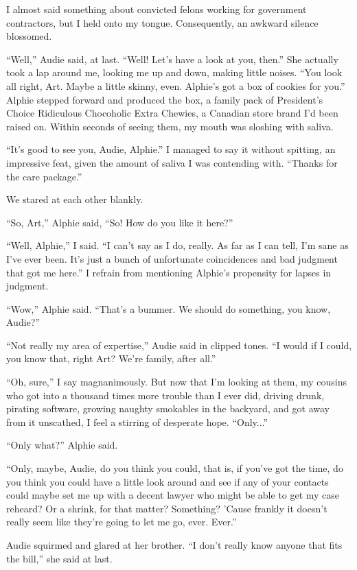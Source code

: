 I almost said something about convicted felons working for
government contractors, but I held onto my tongue. Consequently, an
awkward silence blossomed.

“Well,” Audie said, at last. “Well! Let’s have a look at you,
then.” She actually took a lap around me, looking me up and down,
making little noises. “You look all right, Art. Maybe a little
skinny, even. Alphie’s got a box of cookies for you.” Alphie
stepped forward and produced the box, a family pack of President’s
Choice Ridiculous Chocoholic Extra Chewies, a Canadian store brand
I’d been raised on. Within seconds of seeing them, my mouth was
sloshing with saliva.

“It’s good to see you, Audie, Alphie.” I managed to say it without
spitting, an impressive feat, given the amount of saliva I was
contending with. “Thanks for the care package.”

We stared at each other blankly.

“So, Art,” Alphie said, “So! How do you like it here?”

“Well, Alphie,” I said. “I can’t say as I do, really. As far as I
can tell, I’m sane as I’ve ever been. It’s just a bunch of
unfortunate coincidences and bad judgment that got me here.” I
refrain from mentioning Alphie’s propensity for lapses in
judgment.

“Wow,” Alphie said. “That’s a bummer. We should do something, you
know, Audie?”

“Not really my area of expertise,” Audie said in clipped tones. “I
would if I could, you know that, right Art? We’re family, after
all.”

“Oh, sure,” I say magnanimously. But now that I’m looking at them,
my cousins who got into a thousand times more trouble than I ever
did, driving drunk, pirating software, growing naughty smokables in
the backyard, and got away from it unscathed, I feel a stirring of
desperate hope. “Only...”

“Only what?” Alphie said.

“Only, maybe, Audie, do you think you could, that is, if you’ve got
the time, do you think you could have a little look around and see
if any of your contacts could maybe set me up with a decent lawyer
who might be able to get my case reheard? Or a shrink, for that
matter? Something? ’Cause frankly it doesn’t really seem like
they’re going to let me go, ever. Ever.”

Audie squirmed and glared at her brother. “I don’t really know
anyone that fits the bill,” she said at last.

